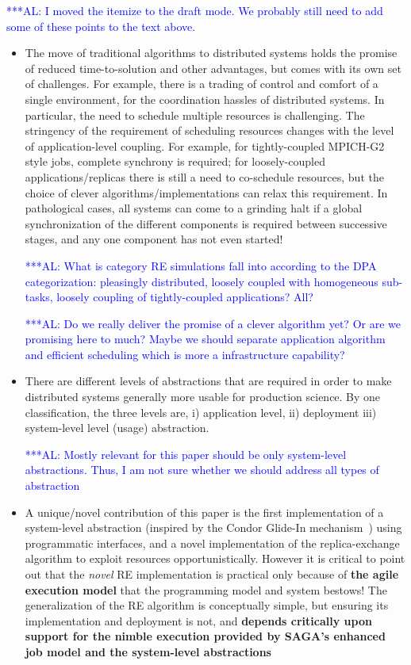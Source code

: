\documentclass{rspublic}
\newif\ifdraft
\newcommand{\alnote}[1]{ {\textcolor{blue} { ***AL: #1 }}}
\newcommand{\alnote}[1]{}
\begin{document}
\ifdraft 
\alnote{I moved the itemize to the draft mode. We probably still need to add some of these
points to the text above.}
\begin{itemize}
  \item The move of traditional algorithms to distributed systems holds
    the promise of reduced time-to-solution and other advantages, but
    comes with its own set of challenges. For example, there is a
    trading of control and comfort of a single environment, for the
    coordination hassles of distributed systems. In particular, the need
    to schedule multiple resources is challenging. The stringency of the
    requirement of scheduling resources changes with the level of
    application-level coupling. For example, for tightly-coupled
    MPICH-G2 style jobs, complete synchrony is required; for
    loosely-coupled applications/replicas there is still a need to
    co-schedule resources, but the choice of clever
    algorithms/implementations can relax this requirement. In
    pathological cases, all systems can come to a grinding halt if a
    global synchronization of the different components is required
    between successive stages, and any one component has not even
    started!  

    \alnote{What is category RE simulations fall into according to the DPA categorization:
    pleasingly distributed, loosely coupled with homogeneous sub-tasks, loosely coupling of tightly-coupled
    applications? All?}

  \alnote{Do we really deliver the promise of a clever algorithm yet? Or
    are we promising here to much? Maybe we should separate application
    algorithm and efficient scheduling which is more a infrastructure
    capability?}

  \item There are different levels of abstractions that are required in
    order to make distributed systems generally more usable for
    production science. By one classification, the three levels are, i)
    application level, ii) deployment iii) system-level level (usage)
    abstraction.


    \alnote{Mostly relevant for this paper should be only system-level
      abstractions. Thus, I am not sure whether we should address all
      types of abstraction}

  \item A unique/novel contribution of this paper is the first
    implementation of a system-level abstraction (inspired by the Condor
    Glide-In mechanism~\citep{citeulike:291860}) using programmatic
    interfaces, and a novel implementation of the replica-exchange
    algorithm to exploit resources opportunistically.  However it is
    critical to point out that the {\it novel} RE implementation is
    practical only because of {\bf the agile execution model} that the
    programming model and system bestows! The generalization of the RE
    algorithm is conceptually simple, but ensuring its implementation
    and deployment is not, and {\bf depends critically upon support for
      the nimble execution provided by SAGA's enhanced job model and the
      system-level abstractions}


\end{itemize}
\end{document}
